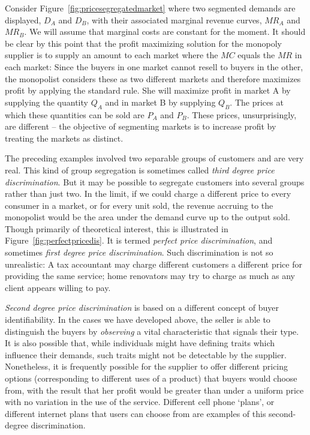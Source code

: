 \newhtmlpage

Consider Figure~\ref{fig:pricesegregatedmarket} where two segmented demands
are displayed, $D_A$ and $D_B$, with their associated marginal revenue
curves, $MR_A$ and $MR_B$. We will assume that marginal costs are constant
for the moment. It should be clear by this point that the profit maximizing
solution for the monopoly supplier is to supply an amount to each market
where the $MC$ equals the $MR$ in each market: Since the buyers in one
market cannot resell to buyers in the other, the monopolist considers these
as two different markets and therefore maximizes profit by applying the
standard rule. She will maximize profit in market A by supplying the
quantity $Q_A$ and in market B by supplying $Q_B$. The prices at which these
quantities can be sold are $P_A$ and $P_B$. These prices, unsurprisingly,
are different -- the objective of segmenting markets is to increase profit
by treating the markets as distinct.



\newhtmlpage

The preceding examples involved two separable groups of customers and are
very real. This kind of group segregation is sometimes called \textit{third
	degree price discrimination}. But it may be possible to segregate customers
into several groups rather than just two. In the limit, if we could charge a
different price to every consumer in a market, or for every unit sold, the
revenue accruing to the monopolist would be the area under the demand curve
up to the output sold. Though primarily of theoretical interest, this is
illustrated in Figure~\ref{fig:perfectpricedis}. It is termed \textit{%
	perfect price discrimination}, and sometimes \textit{first degree price
	discrimination}. Such discrimination is not so unrealistic: A tax accountant
may charge different customers a different price for providing the same
service; home renovators may try to charge as much as any client appears
willing to pay.



\newhtmlpage

\textit{Second degree price discrimination} is based on a different concept
of buyer identifiability. In the cases we have developed above, the seller
is able to distinguish the buyers by \textit{observing} a vital
characteristic that signals their type. It is also possible that, while
individuals might have defining traits which influence their demands, such
traits might not be detectable by the supplier. Nonetheless, it is
frequently possible for the supplier to offer different pricing options
(corresponding to different uses of a product) that buyers would choose
from, with the result that her profit would be greater than under a uniform
price with no variation in the use of the service. Different cell phone
`plans', or different internet plans that users can choose from are examples
of this second-degree discrimination.